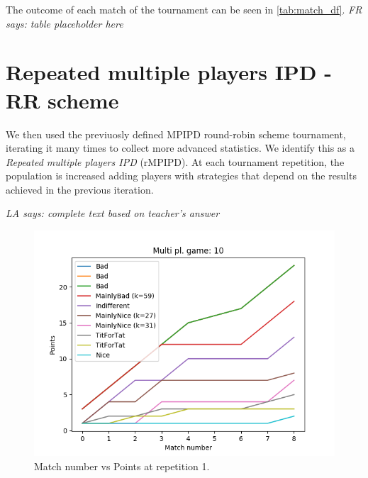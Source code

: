\documentclass[journal,a4paper,10pt,twoside]{IEEEtran}
\newcommand{\FR}[1]{\textit{\color{ForestGreen}FR says: #1}}
\newcommand{\LA}[1]{\textit{\color{orange}LA says: #1}}
\begin{document}
The outcome of each match of the tournament can be seen in \autoref{tab:match_df}. \FR{table placeholder here}

\newpage %
\section{Repeated multiple players IPD - RR scheme} \label{s:rIPDMP}
We then used the previuosly defined MPIPD round-robin scheme tournament, iterating it many times to collect more advanced statistics.
We identify this as a \textit{Repeated multiple players IPD} (rMPIPD).
At each tournament repetition, the population is increased adding players with strategies that depend on the results achieved in the previous iteration.

\LA{complete text based on teacher's answer}

\begin{figure}[ht]
    \centering
    \includegraphics[width=1\columnwidth]{../img_v1/ridpmp-scores-10-r0.png}
    \caption{Match number vs Points at repetition 1.}
    \label{fig:rmpipd1}
\end{figure}
\end{document}
